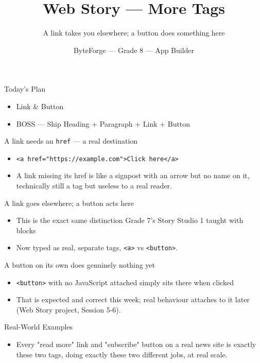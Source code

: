 \documentclass[aspectratio=169]{beamer}
\title{Web Story — More Tags}
\subtitle{A link takes you elsewhere; a button does something here}
\author{ByteForge --- Grade 8 --- App Builder}
\date{}
\begin{document}
\begin{frame}
    \titlepage
\end{frame}

\begin{frame}{Today's Plan}
    \begin{itemize}
        \item Link \& Button
        \item[$\bigstar$] BOSS --- Ship Heading + Paragraph + Link + Button
    \end{itemize}
\end{frame}

\begin{frame}{A link needs an \texttt{href} — a real destination}
    \large
    \begin{itemize}
        \item \texttt{<a href="https://example.com">Click here</a>}
        \item A link missing its href is like a signpost with an arrow but no name on it, technically still a tag but useless to a real reader.
    \end{itemize}
\end{frame}


\begin{frame}{A link goes elsewhere; a button acts here}
    \large
    \begin{itemize}
        \item This is the exact same distinction Grade 7's Story Studio 1 taught with blocks
        \item Now typed as real, separate tags, \texttt{<a>} vs \texttt{<button>}.
    \end{itemize}
\end{frame}


\begin{frame}{A button on its own does genuinely nothing yet}
    \large
    \begin{itemize}
        \item \texttt{<button>} with no JavaScript attached simply sits there when clicked
        \item That is expected and correct this week; real behaviour attaches to it later (Web Story project, Session 5-6).
    \end{itemize}
\end{frame}

\begin{frame}{Real-World Examples}
    \large
    \begin{itemize}
        \item Every "read more" link and "subscribe" button on a real news site is exactly these two tags, doing exactly these two different jobs, at real scale.
    \end{itemize}
\end{frame}
\end{document}
